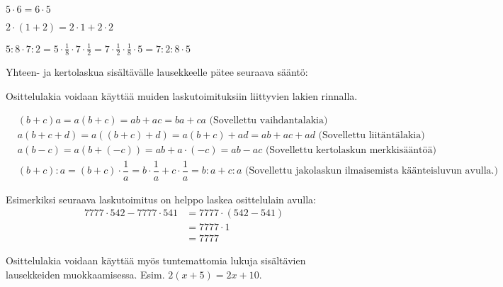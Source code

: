 \begin{esimerkki}

$5 \cdot 6 = 6 \cdot 5$
 
 $2 \cdot (1+2) = 2 \cdot 1 + 2 \cdot 2$
\end{esimerkki} 



\begin{esimerkki}
$5:8\cdot 7:2=5\cdot\frac18\cdot 7\cdot\frac12=7\cdot \frac12\cdot\frac18\cdot 5=7:2:8\cdot 5$
\end{esimerkki} 

Yhteen- ja kertolaskua sisältävälle lausekkeelle pätee seuraava sääntö:


Osittelulakia voidaan käyttää muiden laskutoimituksiin liittyvien lakien rinnalla.

\begin{esimerkki}
\begin{align*}
&(b+c)a = a(b+c) = ab+ac = ba+ca \text{ (Sovellettu vaihdantalakia)} \\
&a(b+c+d) = a((b+c)+d) = a(b+c)+ad = ab+ac+ad \text{ (Sovellettu liitäntälakia)} \\
&a(b-c) = a(b+(-c))=ab+a\cdot(-c)=ab-ac \text{ (Sovellettu kertolaskun merkkisääntöä)} \\
&(b+c):a = (b+c)\cdot\dfrac1a = b\cdot\dfrac1a+c\cdot\dfrac1a = b:a+c:a \text{ (Sovellettu jakolaskun ilmaisemista käänteisluvun avulla.) }
\end{align*}

Esimerkiksi seuraava laskutoimitus on helppo laskea osittelulain avulla: 
     \begin{align*}
	  7777\cdot 542-7777\cdot 541 &= 7777\cdot (542-541)  \\ &= 7777\cdot 1 \\ &= 7777
     \end{align*}
\end{esimerkki}

Osittelulakia voidaan käyttää myös tuntemattomia lukuja sisältävien lausekkeiden muokkaamisessa. Esim. $2(x+5)=2x+10$.

